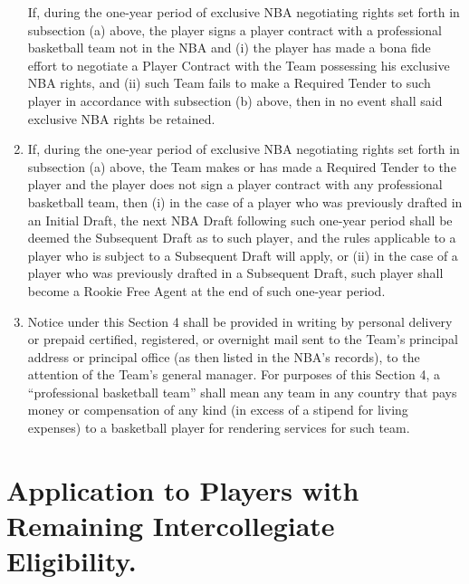 \documentclass[
]{book}
\begin{document}
\begin{enumerate}
  If, during the one-year period of exclusive NBA negotiating rights set forth in subsection (a) above, the player signs a player contract with a professional basketball team not in the NBA and (i) the player has made a bona fide effort to negotiate a Player Contract with the Team possessing his exclusive NBA rights, and (ii) such Team fails to make a Required Tender to such player in accordance with subsection (b) above, then in no event shall said exclusive NBA rights be retained.
\item
  If, during the one-year period of exclusive NBA negotiating rights set forth in subsection (a) above, the Team makes or has made a Required Tender to the player and the player does not sign a player contract with any professional basketball team, then (i) in the case of a player who was previously drafted in an Initial Draft, the next NBA Draft following such one-year period shall be deemed the Subsequent Draft as to such player, and the rules applicable to a player who is subject to a Subsequent Draft will apply, or (ii) in the case of a player who was previously drafted in a Subsequent Draft, such player shall become a Rookie Free Agent at the end of such one-year period.
\item
  Notice under this Section 4 shall be provided in writing by personal delivery or prepaid certified, registered, or overnight mail sent to the Team's principal address or principal office (as then listed in the NBA's records), to the attention of the Team's general manager. For purposes of this Section 4, a ``professional basketball team'' shall mean any team in any country that pays money or compensation of any kind (in excess of a stipend for living expenses) to a basketball player for rendering services for such team.
\end{enumerate}

\hypertarget{application-to-players-with-remaining-intercollegiate-eligibility.}{%
\section{Application to Players with Remaining Intercollegiate Eligibility.}\label{application-to-players-with-remaining-intercollegiate-eligibility.}}
\end{document}

